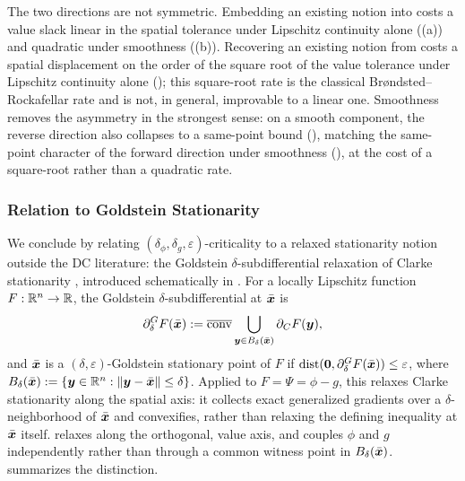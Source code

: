 \begin{remark}
The two directions are not symmetric. Embedding an existing notion into
 costs a value slack linear in the spatial
tolerance under Lipschitz continuity alone ((a))
and quadratic under smoothness ((b)). Recovering
an existing notion from  costs a spatial
displacement on the order of the square root of the value tolerance under
Lipschitz continuity alone (); this square-root
rate is the classical Brøndsted--Rockafellar rate and is not, in general,
improvable to a linear one. Smoothness removes the asymmetry in the
strongest sense: on a smooth component, the reverse direction also
collapses to a same-point bound (), matching the
same-point character of the forward direction under smoothness
(), at the cost of a square-root rather than a
quadratic rate.
\end{remark}

\subsubsection{Relation to Goldstein Stationarity}

We conclude by relating $(\delta_\phi,\delta_g,\varepsilon)$-criticality to
a relaxed stationarity notion outside the DC literature: the Goldstein
$\delta$-subdifferential relaxation of Clarke stationarity
\citep{goldstein1977optimization,Zhang-2020-Complexity}, introduced
schematically in . For a
locally Lipschitz function $F:\mathbb{R}^n\to\mathbb{R}$, the Goldstein
$\delta$-subdifferential at $\bar{\bm{x}}$ is
\[
    \partial_\delta^G F(\bar{\bm{x}})
    :=
    \overline{\operatorname{conv}}
    \bigcup_{\bm{y}\in B_\delta(\bar{\bm{x}})}
    \partial_C F(\bm{y}),
\]
and $\bar{\bm{x}}$ is a $(\delta,\varepsilon)$-Goldstein stationary point of $F$
if $\operatorname{dist}(\bm{0},\partial_\delta^G F(\bar{\bm{x}}))\le\varepsilon$,
where $B_\delta(\bar{\bm{x}}):=\{\bm{y}\in\mathbb{R}^n:\|\bm{y}-\bar{\bm{x}}\|\le\delta\}$.
Applied to $F=\Psi=\phi-g$, this relaxes Clarke stationarity along the
spatial axis: it collects exact generalized gradients over a
$\delta$-neighborhood of $\bar{\bm{x}}$ and convexifies, rather than relaxing
the defining inequality at $\bar{\bm{x}}$ itself. 
relaxes along the orthogonal, value axis, and couples $\phi$ and $g$
independently rather than through a common witness point in
$B_\delta(\bar{\bm{x}})$.  summarizes the
distinction.

